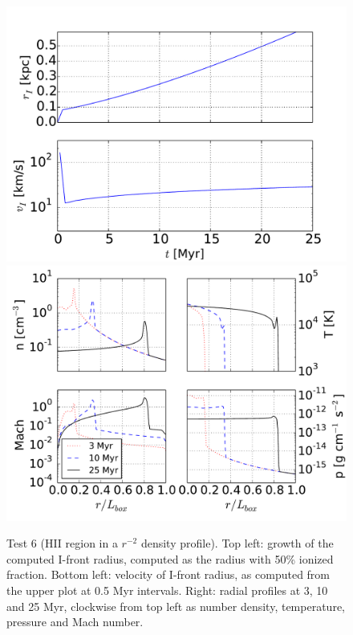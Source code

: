 \begin{figure}[t]
\centerline{\hfill
  \includegraphics[scale=0.42, trim=0.0cm 0.0cm 0.0cm 0.0cm]{test6_radius.pdf}
  \includegraphics[scale=0.42, trim=0.0cm 0.0cm 0.0cm 0.0cm]{test6_profiles.pdf}
  \hfill}
  \caption{Test 6 (HII region in a $r^{-2}$ density profile).  Top
    left: growth of the computed I-front radius, computed as the
    radius with 50\% ionized fraction.  Bottom left: velocity of
    I-front radius, as computed from the upper plot at 0.5 Myr
    intervals.  Right: radial profiles at 3, 10 and 25 Myr, clockwise
    from top left as number density, temperature, pressure and Mach
    number.} 
  \label{fig:test6_plots}
\end{figure}

